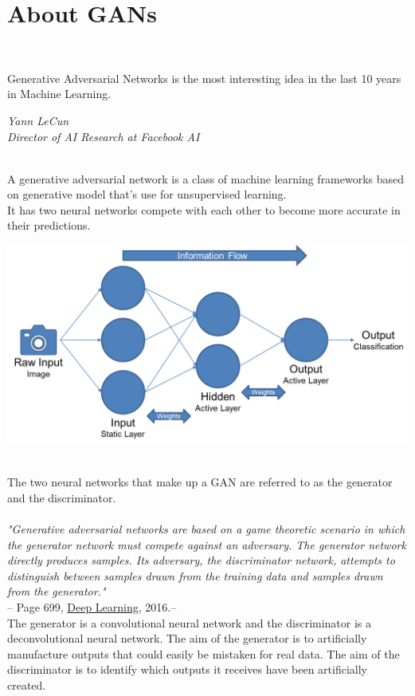 \documentclass[14pt]{article}
\begin{document}
\section{About GANs}
\\
\epigraph{Generative Adversarial Networks is the most interesting idea in the last 10 years in Machine Learning.}{\textit{ Yann LeCun \\ Director of AI Research at Facebook AI}}
\\
A generative adversarial network is a class of machine learning frameworks  based on generative model that’s use for unsupervised learning. 
\\
It has two neural networks compete with each other to become more accurate in their predictions. 
\begin{center}
    \includegraphics[width = 11 cm ]{1.png}
\end{center}
\\
The two neural networks that make up a GAN are referred to as the generator and the discriminator.
\\ \\ 
\hspace*{1cm} \textit{"Generative adversarial networks are based on a game theoretic scenario in which the generator network must compete against an adversary. The generator network directly produces samples. Its adversary, the discriminator network, attempts to distinguish between samples drawn from the training data and samples drawn from the generator."}\\
\hspace*{5cm} -- Page 699, \href{https://www.amazon.com/Deep-Learning-Adaptive-Computation-Machine/dp/0262035618/ref=as_li_ss_tl?keywords=deep+learning&qid=1553730173&s=books&sr=1-1&linkCode=sl1&tag=inspiredalgor-20&linkId=e9ef92a6248b927689728a8bf72b7cd1&language=en_US}{Deep Learning}, 2016.--  
\\
The generator is a convolutional neural network and the discriminator is a deconvolutional neural network. The aim of the generator is to artificially manufacture outputs that could easily be mistaken for real data. The aim of the discriminator is to identify which outputs it receives have been artificially created. 
\end{document}
